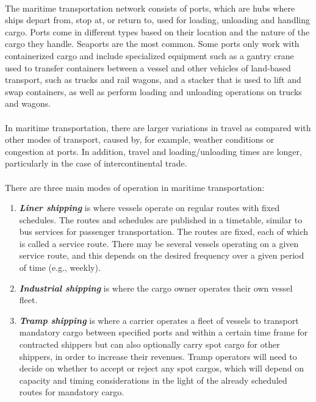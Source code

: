 \paragraph{}
The maritime transportation network consists of ports, which are hubs where ships depart from, stop at, or return to, used for loading, unloading and handling cargo. Ports come in different types based on their location and the nature of the cargo they handle. Seaports are the most common. Some ports only work with containerized cargo and include specialized equipment such as a gantry crane used to transfer containers between a vessel and other vehicles of land-based transport, such as trucks and rail wagons, and a stacker that is used to lift and swap containers, as well as perform loading and unloading operations on trucks and wagons.
\paragraph{}
In maritime transportation, there are larger variations in travel as compared with other modes of transport, caused by, for example, weather conditions or congestion at ports. In addition, travel and loading/unloading times are longer, particularly in the case of intercontinental trade.
\paragraph{}
There are three main modes of operation in maritime transportation:
\begin{enumerate}
	\item \textbf{\textit{Liner shipping}} is where vessels operate on regular routes with fixed schedules. The routes and schedules are published in a timetable, similar to bus services for passenger transportation. The routes are fixed, each of which is called a service route. There may be several vessels operating on a given service route, and this depends on the desired frequency over a given period of time (e.g., weekly).
	\item \textbf{\textit{Industrial shipping}} is where the cargo owner operates their own vessel fleet.
	\item \textbf{\textit{Tramp shipping}} is where a carrier operates a fleet of vessels to transport mandatory cargo between specified ports and within a certain time frame for contracted shippers but can also optionally carry spot cargo for other shippers, in order to increase their revenues. Tramp operators will need to decide on whether to accept or reject any spot cargos, which will depend on capacity and timing considerations in the light of the already scheduled routes for mandatory cargo.
\end{enumerate}
